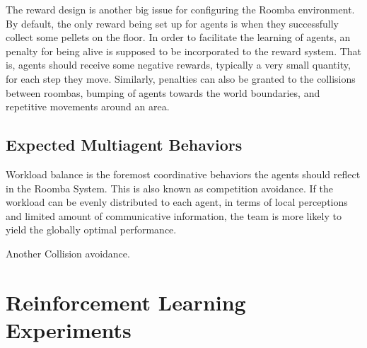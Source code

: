 \documentclass[conference]{IEEEtran}
\begin{document}
The reward design is another big issue for
configuring the Roomba environment. By default, the only reward being set up
for agents is when they successfully collect some pellets on the floor. In
order to facilitate the learning of agents, an penalty for being alive is
supposed to be incorporated to the reward system. That is, agents should
receive some negative rewards, typically a very small quantity, for each step
they move. Similarly, penalties can also be granted to the collisions between
roombas, bumping of agents towards the world boundaries, and repetitive
movements around an area.

\subsection{Expected Multiagent Behaviors}

Workload balance is the foremost coordinative behaviors the
agents should reflect in the Roomba System. This is also known as competition
avoidance. If the workload can be evenly distributed to each agent, in terms of
local perceptions and limited amount of communicative information, the team is
more likely to yield the globally optimal performance.

Another Collision avoidance. 

%
%
%

\section{Reinforcement Learning Experiments}
\label{section:rlexpo} 
\end{document}
